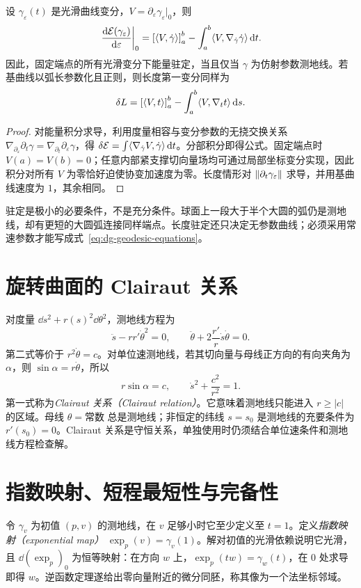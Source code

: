 \begin{theorem}[第一变分公式]
设 $\gamma_\varepsilon(t)$ 是光滑曲线变分，$V=\partial_\varepsilon\gamma_\varepsilon|_0$，则
\begin{equation}
 \left.\frac{\mathop{}\!\mathrm d\mathcal E(\gamma_\varepsilon)}{\mathop{}\!\mathrm d\varepsilon}\right|_0
 =\left[\langle V,\dot\gamma\rangle\right]_a^b
 -\int_a^b\langle V,\nabla_{\dot\gamma}\dot\gamma\rangle\mathop{}\!\mathrm d t.
 \label{eq:dg-energy-variation}
\end{equation}
因此，固定端点的所有光滑变分下能量驻定，当且仅当 $\gamma$ 为仿射参数测地线。若基曲线以弧长参数化且正则，则长度第一变分同样为
\begin{equation}
 \delta L=\left[\langle V,t\rangle\right]_a^b-\int_a^b\langle V,\nabla_t t\rangle\mathop{}\!\mathrm d s.
 \label{eq:dg-length-variation}
\end{equation}
\end{theorem}
\begin{proof}
对能量积分求导，利用度量相容与变分参数的无挠交换关系 $\nabla_{\partial_\varepsilon}\partial_t\gamma=\nabla_{\partial_t}\partial_\varepsilon\gamma$，得 $\delta\mathcal E=\int\langle \nabla_{\dot\gamma}V,\dot\gamma\rangle\mathop{}\!\mathrm d t$。分部积分即得公式。固定端点时 $V(a)=V(b)=0$；任意内部紧支撑切向量场均可通过局部坐标变分实现，因此积分对所有 $V$ 为零恰好迫使协变加速度为零。长度情形对 $\lVert \partial_t\gamma_\varepsilon\rVert$ 求导，并用基曲线速度为 $1$，其余相同。
\end{proof}
驻定是极小的必要条件，不是充分条件。球面上一段大于半个大圆的弧仍是测地线，却有更短的大圆弧连接同样端点。长度驻定还只决定无参数曲线；必须采用常速参数才能写成式~\eqref{eq:dg-geodesic-equations}。

\section{旋转曲面的 Clairaut 关系}
对度量 $\dd s^2+r(s)^2\dd\theta^2$，测地线方程为
\[
 \ddot s-rr'\dot\theta^2=0,\qquad
 \ddot\theta+2\frac{r'}r\dot s\dot\theta=0.
\]
第二式等价于 $r^2\dot\theta=c$。对单位速测地线，若其切向量与母线正方向的有向夹角为 $\alpha$，则 $\sin\alpha=r\dot\theta$，所以
\begin{equation}
 r\sin\alpha=c,\qquad
 \dot s^2+\frac{c^2}{r^2}=1.
 \label{eq:dg-clairaut}
\end{equation}
第一式称为\emph{Clairaut 关系（Clairaut relation）}。它意味着测地线只能进入 $r\ge|c|$ 的区域。母线 $\theta=\text{常数}$ 总是测地线；非恒定的纬线 $s=s_0$ 是测地线的充要条件为 $r'(s_0)=0$。Clairaut 关系是守恒关系，单独使用时仍须结合单位速条件和测地线方程检查解。

\section{指数映射、短程最短性与完备性}
令 $\gamma_v$ 为初值 $(p,v)$ 的测地线，在 $v$ 足够小时它至少定义至 $t=1$。定义\emph{指数映射（exponential map）} $\exp_p(v)=\gamma_v(1)$。解对初值的光滑依赖说明它光滑，且 $\dd(\exp_p)_0$ 为恒等映射：在方向 $w$ 上，$\exp_p(tw)=\gamma_w(t)$，在 $0$ 处求导即得 $w$。逆函数定理遂给出零向量附近的微分同胚，称其像为一个法坐标邻域。

